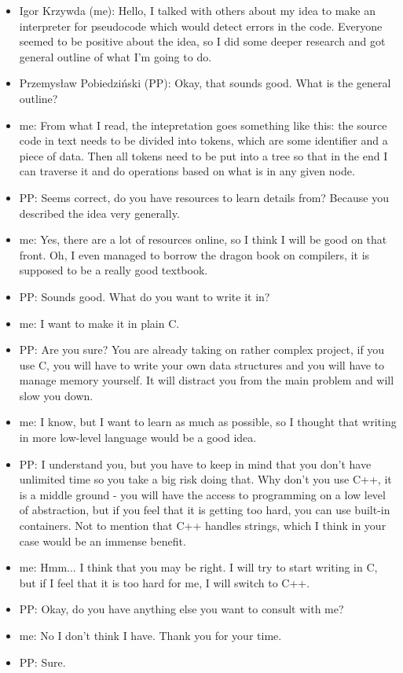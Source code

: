 \documentclass{article}
\begin{document}
    \begin{itemize}
        \item Igor Krzywda (me): Hello, I talked with others about my idea to make
            an interpreter for pseudocode which would detect errors in the code.
            Everyone seemed to be positive about the idea, so I did some deeper
            research and got general outline of what I'm going to do.
        \item Przemysław Pobiedziński (PP): Okay, that sounds good. What is the
            general outline?
        \item me: From what I read, the intepretation goes something like this:
            the source code in text needs to be divided into tokens, which are
            some identifier and a piece of data. Then all tokens need to be put
            into a tree so that in the end I can traverse it and do operations
            based on what is in any given node.
        \item PP: Seems correct, do you have resources to learn details from?
            Because you described the idea very generally.
        \item me: Yes, there are a lot of resources online, so I think I will
            be good on that front. Oh, I even managed to borrow the dragon book
            on compilers, it is supposed to be a really good textbook.
        \item PP: Sounds good. What do you want to write it in?
        \item me: I want to make it in plain C.
        \item PP: Are you sure? You are already taking on rather complex project,
            if you use C, you will have to write your own data structures and you
            will have to manage memory yourself. It will distract you from the main
            problem and will slow you down.
        \item me: I know, but I want to learn as much as possible, so I thought 
            that writing in more low-level language would be a good idea.
        \item PP: I understand you, but you have to keep in mind that you don't 
            have unlimited time so you take a big risk doing that. Why don't you
            use C++, it is a middle ground - you will have the access to programming
            on a low level of abstraction, but if you feel that it is getting too
            hard, you can use built-in containers. Not to mention that C++ handles
            strings, which I think in your case would be an immense benefit.
        \item me: Hmm... I think that you may be right. I will try to start writing
            in C, but if I feel that it is too hard for me, I will switch to C++.
        \item PP: Okay, do you have anything else you want to consult with me?
        \item me: No I don't think I have. Thank you for your time.
        \item PP: Sure.
    \end{itemize}
\end{document}
